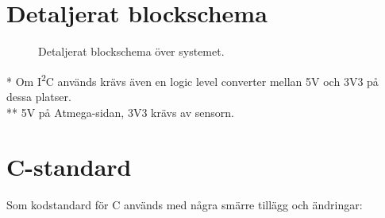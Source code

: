 \documentclass[a4paper,11pt]{article}
\begin{document}
\clearpage
\begin{appendices}

\section{Detaljerat blockschema}
\begin{figure}[h!]
    \caption{Detaljerat blockschema över systemet.}
    \label{fig:modulesDetailed}
\end{figure}

\noindent \begin{small}
    * Om I\textsuperscript{2}C används krävs även en logic level converter mellan 5V och 3V3 på dessa platser.\\
    ** 5V på Atmega-sidan, 3V3 krävs av sensorn.
\end{small}

\clearpage

\section{C-standard} \label{sec:cstandard}
Som kodstandard för C används \cite{cstandard} med några smärre tillägg och ändringar:


\end{appendices}
\end{document}
